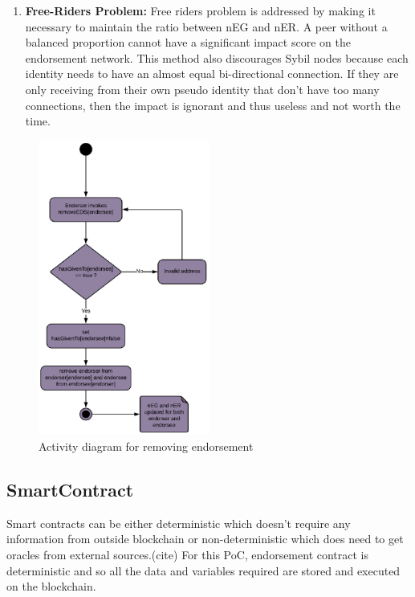\begin{enumerate}
		the endorsement decision that an entity can take. Therefore, the design
		also considers removal of endorsement previously assigned. The removal
		of endorsement is captured by the figure  ~\ref{fig:removeEds}. 
	\item \textbf{Free-Riders Problem:} Free riders problem is addressed by
		making it necessary to maintain the ratio between nEG and nER. A peer
		without a balanced proportion cannot have a significant impact score on
		the endorsement network. This method also discourages Sybil nodes
		because each identity needs to have an almost equal bi-directional
		connection. If they are only receiving from their own pseudo identity
		that don't have too many connections, then the impact is ignorant and
		thus useless and not worth the time.
\end{enumerate}
\begin{figure}
	\centering
	\includegraphics[width=0.5\textwidth]{Images/ActivityDiagramRemoveEDS.eps}
	\caption{Activity diagram for removing endorsement}
	\label{fig:removeEds}
\end{figure}


\subsection{SmartContract} 
Smart contracts can be either
deterministic which doesn't require any information from outside blockchain or
non-deterministic which does need to get oracles from external sources.(cite) For
this PoC, endorsement contract is deterministic and so all the data and
variables required are stored and executed on the blockchain. \\

